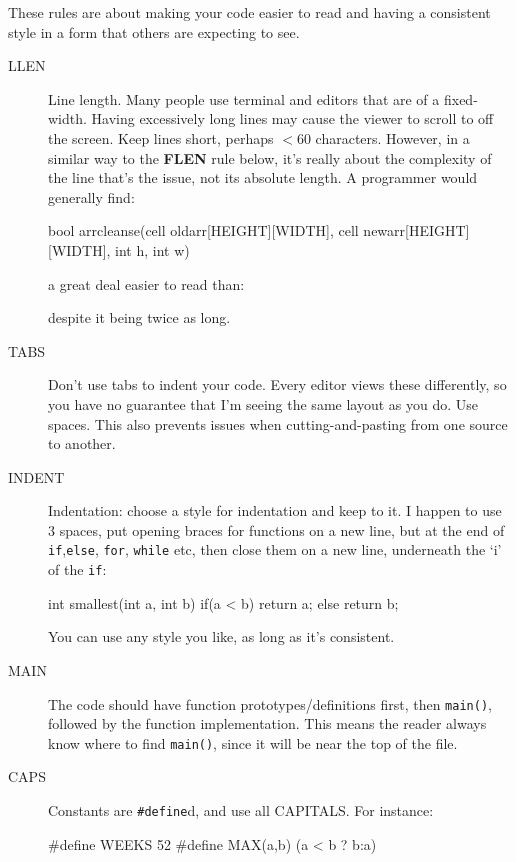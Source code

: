 
These rules are about making your code easier to read and having a consistent
style in a form that others are expecting to see.

\begin{description}

\item[LLEN] Line length. Many people use terminal and editors that are
of a fixed-width. Having excessively long lines may cause the viewer to scroll to
off the screen. Keep lines short, perhaps $< 60$ characters. However, in a similar way
to the {\bf FLEN} rule below, it's really about the complexity of the line that's the issue,
not its absolute length. A programmer would generally find:
{\small
\begin{codesnippet}
bool arrcleanse(cell oldarr[HEIGHT][WIDTH], cell newarr[HEIGHT][WIDTH], int h, int w)
\end{codesnippet}
}
a great deal easier to read than:
\begin{codesnippet}
if(a < b && j++ >= szpar(e ? true : false) || h==4){
\end{codesnippet}
despite it being twice as long.

\item[TABS] Don't use tabs to indent your code. Every editor views these differently, so you have no guarantee that I'm seeing the same layout as you do. Use spaces. This also prevents issues when cutting-and-pasting from one source to another.

\item[INDENT] Indentation: choose a style for indentation
and keep to it. I happen to use $3$ spaces, put opening braces
for functions on a new line, but at the end of \verb^if^,\verb^else^, \verb^for^, \verb^while^ etc, then close them on a new line, underneath the `i' of the \verb^if^:
\begin{codesnippet}
int smallest(int a, int b)
{
   if(a < b){
      return a;
   }
   else{
      return b;
   }
}
\end{codesnippet}
You can use any style you like, as long as it's consistent.

\item[MAIN] The code should have function prototypes/definitions first, then \verb^main()^, followed by the function implementation. This means the reader always know where to find \verb^main()^, since it will be near the top of the file.


\item[CAPS] Constants are \verb^#define^d, and use all CAPITALS. For instance:
\begin{codesnippet}
#define WEEKS 52
#define MAX(a,b) (a < b ? b:a)
\end{codesnippet}



\end{description}
